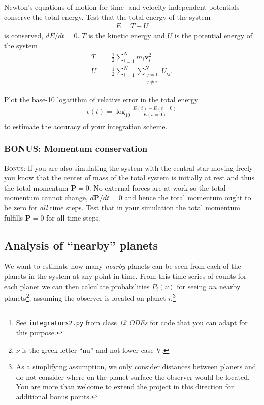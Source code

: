 \documentclass[letterpaper]{scrartcl}
\newcommand{\BONUS}{\textsc{Bonus: }}
\renewcommand{\vec}[1]{\ensuremath{\mathbf{#1}}}
\begin{document}
Newton's equations of motion for time- and velocity-independent
potentials conserve the total energy. Test that the total energy of
the system
\begin{gather}
  \label{eq:energy}
  E = T + U
\end{gather}
is conserved, $dE/dt = 0$. $T$ is the kinetic energy and $U$ is the
potential energy of the system
\begin{align}
  \label{eq:KE}
  T &= \frac{1}{2} \sum_{i=1}^{N} m_{i} \vec{v}_{i}^{2}\\
  \label{eq:PE}
  U &= \frac{1}{2}\sum_{i=1}^{N}\sum_{\substack{j=1\\j \neq i}}^{N} U_{ij}.
\end{align}

Plot the base-10 logarithm of relative error in the total energy 
\begin{gather}
  \label{eq:energyaccuracy}
  \epsilon(t) = \log_{10} \frac{E(t) - E(t=0)}{E(t=0)} 
\end{gather}
to estimate the accuracy of your integration scheme.\footnote{See
  \texttt{integrators2.py} from class \emph{12 ODEs} for code that you
  can adapt for this purpose.}

\subsubsection{BONUS: Momentum conservation}
\label{sec:momentum}

\BONUS If you are also simulating the system with the central star
moving freely you know that the center of mass of the total system is
initially at rest and thus the total momentum $\vec{P}=0$. No external
forces are at work so the total momentum cannot change,
$d\vec{P}/dt = 0$ and hence the total momentum ought to be zero for
\emph{all} time steps. Test that in your simulation the total momentum
fulfills $\vec{P} = 0$ for all time steps.


\subsection{Analysis of ``nearby'' planets}
\label{sec:nearby}

We want to estimate how many \emph{nearby} planets can be seen from
each of the planets in the system at any point in time. From this time
series of counts for each planet we can then calculate probabilities
$P_{i}(\nu)$ for seeing $nu$ nearby planets\footnote{$\nu$ is the
  greek letter ``nu'' and not lower-case V.}, assuming the observer is
located on planet $i$.\footnote{As a simplifying assumption, we only
  consider distances between planets and do not consider where on the
  planet surface the observer would be located. You are more than
  welcome to extend the project in this direction for additional bonus
  points.}
\end{document}
